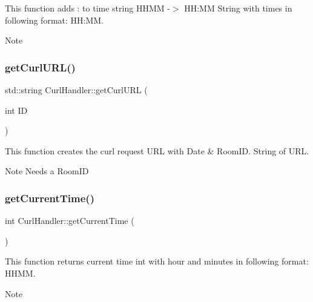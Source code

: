 This function adds \+: to time string H\+H\+MM -\/$>$ HH\+:MM  String with times in following format\+: HH\+:MM. 

\begin{DoxyNote}{Note}

\end{DoxyNote}
\mbox{\label{classCurlHandler_a967784524e6d6d95b1d7089e3221fbfb}} 
\subsubsection{\texorpdfstring{get\+Curl\+U\+R\+L()}{getCurlURL()}}
{\footnotesize\ttfamily std\+::string Curl\+Handler\+::get\+Curl\+U\+RL (\begin{DoxyParamCaption}\item[{int}]{ID }\end{DoxyParamCaption})}



This function creates the curl request U\+RL with Date \& Room\+ID.  String of U\+RL. 

\begin{DoxyNote}{Note}
Needs a Room\+ID 
\end{DoxyNote}
\mbox{\label{classCurlHandler_a54e7bc698682a0b313b3de0f6d2c7cf4}} 
\subsubsection{\texorpdfstring{get\+Current\+Time()}{getCurrentTime()}}
{\footnotesize\ttfamily int Curl\+Handler\+::get\+Current\+Time (\begin{DoxyParamCaption}{ }\end{DoxyParamCaption})}



This function returns current time  int with hour and minutes in following format\+: H\+H\+MM. 

\begin{DoxyNote}{Note}

\end{DoxyNote}
\mbox{\label{classCurlHandler_af36e06319f16a97938bfb9a2ee8c0fa6}} 
